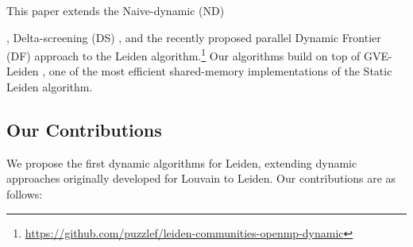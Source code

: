 This paper extends the Naive-dynamic (ND) \cite{com-aynaud10}, Delta-screening (DS) \cite{com-zarayeneh21}, and the recently proposed parallel Dynamic Frontier (DF) approach \cite{sahu2024shared} to the Leiden algorithm.\footnote{\url{https://github.com/puzzlef/leiden-communities-openmp-dynamic}} Our algorithms build on top of GVE-Leiden \cite{sahu2024fast}, one of the most efficient shared-memory implementations of the Static Leiden algorithm.




\subsection{Our Contributions}

We propose the first dynamic algorithms for Leiden, extending dynamic approaches originally developed for Louvain \cite{com-aynaud10, com-zarayeneh21, sahu2024shared} to Leiden. Our contributions are as follows:

